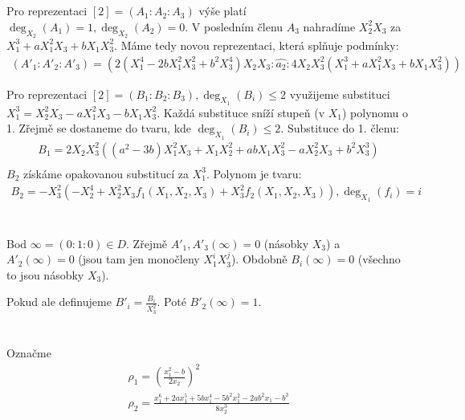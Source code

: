 \documentclass[12pt, a4paper]{article}
\begin{document}
\section{}
Pro reprezentaci $[2] = (A_1 : A_2 : A_3)$ výše platí $\deg_{X_2}(A_1) = 1, \deg_{X_2}(A_2) = 0$. V posledním členu $A_3$ nahradíme $X_2^2X_3$ za $X_1^3+aX_1^2X_3+bX_1X_3^2$. Máme tedy novou reprezentaci, která splňuje podmínky:
\begin{gather*}
(A'_1 : A'_2 : A'_3) = (2(X_1^4-2bX_1^2X_3^2 + b^2X_3^4)X_2X_3 : \widehat{a_2} : 4X_2X_3^2(X_1^3+aX_1^2X_3+bX_1X_3^2))
\end{gather*}

Pro reprezentaci $[2] = (B_1 : B_2 : B_3), \deg_{X_1}(B_i)\leq 2$ využijeme substituci $X_1^3 = X_2^2X_3-aX_1^2X_3-bX_1X_3^2$. Každá substituce sníží stupeň (v $X_1$) polynomu o 1. Zřejmě se dostaneme do tvaru, kde $\deg_{X_1}(B_i)\leq 2$. Substituce do 1. členu:
\begin{gather*}
B_1 = 2X_2X_3^2((a^2-3b)X_1^2X_3+X_1X_2^2+abX_1X_3^2-aX_2^2X_3+b^2X_3^3)\\
\end{gather*}
$B_2$ získáme opakovanou substitucí za $X_1^3$. Polynom je tvaru:
\begin{gather*}
B_2 = -X_3^2(-X_2^4+X_2^2X_3f_1(X_1,X_2,X_3) + X_3^2f_2(X_1,X_2,X_3)), \deg_{X_1}(f_i) = i
\end{gather*}

\section{}
Bod $\infty = (0:1:0) \in D$. Zřejmě $A'_1,A'_3(\infty) = 0$ (násobky $X_3$) a $A'_2(\infty) = 0$ (jsou tam jen monočleny $X_1^iX_3^j$). Obdobně $B_i(\infty)=0$ (všechno to jsou násobky $X_3$).

Pokud ale definujeme $B'_i = \frac{B_i}{X_3^2}$. Poté $B'_2(\infty) = 1$.

\section{}
Označme
\begin{gather*}
\rho_1 = \left( \frac{x_1^2-b}{2x_2} \right)^2\\
\rho_2 = \frac{x_1^6+2ax_1^5+5bx_1^4-5b^2x_1^2-2ab^2x_1-b^3}{8x_2^3}
\end{gather*}
\end{document}
